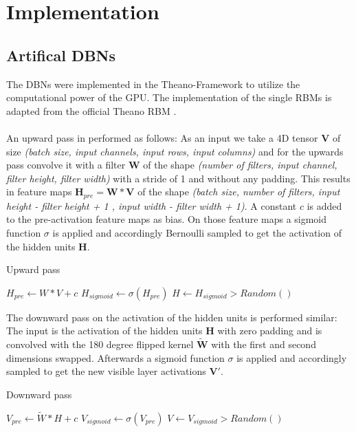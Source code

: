 \chapter{Implementation} \label{c:impl}


\section{Artifical DBNs} \label{c:dbnimpl}

The DBNs were implemented in the Theano-Framework \cite{2016arXiv160502688full} to utilize the computational power of the GPU.
The implementation of the single RBMs is adapted from the official Theano RBM \cite{theanoRBM}.
\\
\\
An upward pass in performed as follows:
As an input we take a 4D tensor $\textbf{V}$ of size \textit{(batch size, input channels, input rows, input columns)} and for the upwards pass convolve it with a filter $\textbf{W}$ of the shape \textit{(number of filters, input channel, filter height, filter width)} with a stride of 1 and without any padding.
This results in feature maps $\textbf{H}_{pre} = \textbf{W} * \textbf{V}$ of the shape \textit{(batch size, number of filters, input height - filter height + 1 , input width - filter width + 1)}.
A constant $c$ is added to the pre-activation feature maps as bias.
On those feature maps a sigmoid function $\sigma$ is applied and accordingly Bernoulli sampled to get the activation of the hidden units $\textbf{H}$.

\begin{algorithm}
\caption{Upward pass}
\begin{algorithmic}
\State ${H}_{pre}\gets W * V + c $  
\State ${H}_{sigmoid} \gets \sigma({H}_{pre})$
\State $H \gets {H}_{sigmoid} > Random()$
\end{algorithmic}
\end{algorithm}


The downward pass on the activation of the hidden units is performed similar:
The input is the activation of the hidden units $\textbf{H}$ with zero padding and is convolved with the 180 degree flipped kernel $\tilde{\textbf{W}}$ with the first and second dimensions swapped.
Afterwards a sigmoid function $\sigma$ is applied and accordingly sampled to get the new visible layer activations $\textbf{V}'$.

\begin{algorithm}
\caption{Downward pass}
\begin{algorithmic}
\State ${V}_{pre}\gets \tilde{W} * H + c $  
\State ${V}_{sigmoid} \gets \sigma({V}_{pre})$
\State $V \gets {V}_{sigmoid} > Random()$
\end{algorithmic}
\end{algorithm}


